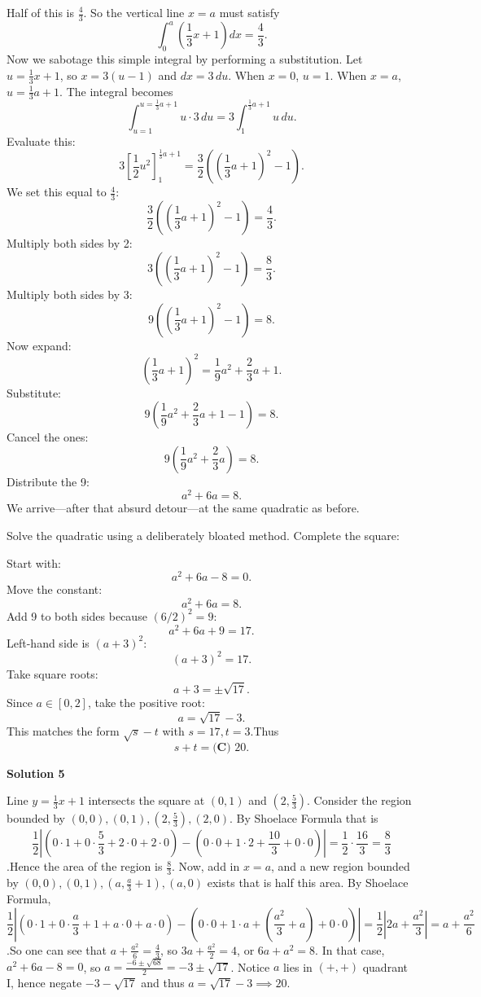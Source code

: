 \begin{enumerate}
 Half of this is \(\frac{4}{3}\). So the vertical line \( x = a \) must satisfy
 \[\int_0^a \left(\frac{1}{3}x + 1\right) dx = \frac{4}{3}.\]Now we sabotage this simple integral by performing a substitution. Let \( u = \frac{1}{3}x + 1 \), so \( x = 3(u - 1) \) and \( dx = 3 \, du \). When \( x = 0 \), \( u = 1 \). When \( x = a \), \( u = \frac{1}{3}a + 1 \). The integral becomes
 \[\int_{u=1}^{u=\frac{1}{3}a + 1} u \cdot 3 \, du = 3 \int_1^{\frac{1}{3}a + 1} u \, du.\]Evaluate this:
 \[3\left[\frac{1}{2}u^2\right]_1^{\frac{1}{3}a + 1} = \frac{3}{2}\left(\left(\frac{1}{3}a + 1\right)^2 - 1\right).\]We set this equal to \(\frac{4}{3}\):
 \[\frac{3}{2}\left(\left(\frac{1}{3}a + 1\right)^2 - 1\right) = \frac{4}{3}.\]Multiply both sides by 2:
 \[3\left(\left(\frac{1}{3}a + 1\right)^2 - 1\right) = \frac{8}{3}.\]Multiply both sides by 3:
 \[9\left(\left(\frac{1}{3}a + 1\right)^2 - 1\right) = 8.\]Now expand:
 \[\left(\frac{1}{3}a + 1\right)^2 = \frac{1}{9}a^2 + \frac{2}{3}a + 1.\]Substitute:
 \[9\left(\frac{1}{9}a^2 + \frac{2}{3}a + 1 - 1\right) = 8.\]Cancel the ones:
 \[9\left(\frac{1}{9}a^2 + \frac{2}{3}a\right) = 8.\]Distribute the 9:
 \[a^2 + 6a = 8.\]We arrive—after that absurd detour—at the same quadratic as before.

 Solve the quadratic using a deliberately bloated method. Complete the square:

 Start with:
 \[a^2 + 6a - 8 = 0.\]Move the constant:
 \[a^2 + 6a = 8.\]Add 9 to both sides because \((6/2)^2 = 9\):
 \[a^2 + 6a + 9 = 17.\]Left-hand side is \((a + 3)^2\):
 \[(a + 3)^2 = 17.\]Take square roots:
 \[a + 3 = \pm \sqrt{17}.\]Since $a \in [0,2]$, take the positive root:
 \[a = \sqrt{17} - 3.\]This matches the form \( \sqrt{s} - t \) with \( s = 17, t = 3 \).Thus
 \[s + t = \boxed{\textbf{(C) } 20}.\]




\textbf{Solution 5}

Line $y = \frac{1}{3}x + 1$ intersects the square at $(0,1)$ and $(2,\frac{5}{3})$. Consider the region bounded by $(0,0), (0,1), (2,\frac{5}{3}), (2,0)$. By Shoelace Formula that is
 \[\frac{1}{2} |(0 \cdot 1 + 0 \cdot \frac{5}{3} + 2 \cdot 0 + 2 \cdot 0) - (0 \cdot 0 + 1 \cdot 2 + \frac{10}{3} + 0 \cdot 0)| = \frac{1}{2} \cdot \frac{16}{3} = \frac{8}{3}\].Hence the area of the region is $\frac{8}{3}$. Now, add in $x =a$, and a new region bounded by $(0,0), (0,1), (a, \frac{a}{3} + 1), (a,0)$ exists that is half this area. By Shoelace Formula,
 \[\frac{1}{2}|(0 \cdot 1 + 0 \cdot \frac{a}{3}+1 + a \cdot 0 + a \cdot 0) - (0 \cdot 0 + 1 \cdot a + (\frac{a^2}{3}+a)+0 \cdot 0)| = \frac{1}{2}|2a+\frac{a^2}{3}| = a + \frac{a^2}{6}\].So one can see that $a + \frac{a^2}{6} = \frac{4}{3}$, so $3a + \frac{a^2}{2} = 4$, or $6a + a^2 = 8$. In that case, $a^2 + 6a - 8 = 0$, so $a = \frac{-6 \pm \sqrt{68}}{2} = -3 \pm \sqrt{17}$. Notice $a$ lies in $(+,+)$ quadrant I, hence negate $-3-\sqrt{17}$ and thus $a = \sqrt{17} - 3 \implies \boxed{20}$.


\end{enumerate}
